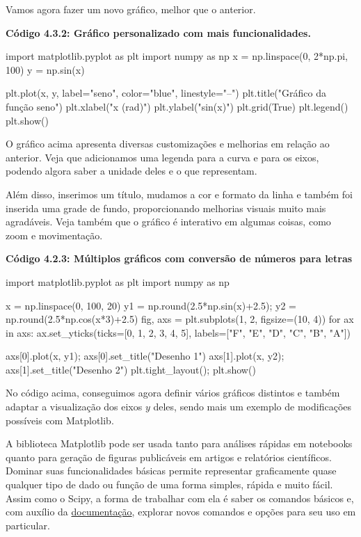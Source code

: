 \documentclass[11pt, a4paper]{article}
\begin{document}
Vamos agora fazer um novo gráfico, melhor que o anterior.

\textbf{Código 4.3.2: Gráfico personalizado com mais funcionalidades.}

\begin{code}
import matplotlib.pyplot as plt
import numpy as np
x = np.linspace(0, 2*np.pi, 100)
y = np.sin(x)

plt.plot(x, y, label="seno", color="blue", linestyle="--")
plt.title("Gráfico da função seno")
plt.xlabel("x (rad)")
plt.ylabel("sin(x)")
plt.grid(True)
plt.legend()
plt.show()
\end{code}

O gráfico acima apresenta diversas customizações e melhorias em relação ao anterior. Veja que adicionamos uma legenda para a curva e para os eixos, podendo algora saber a unidade deles e o que representam.

Além disso, inserimos um título, mudamos a cor e formato da linha e também foi inserida uma grade de fundo, proporcionando melhorias visuais muito mais agradáveis. Veja também que o gráfico é interativo em algumas coisas, como zoom e movimentação.

\textbf{Código 4.2.3: Múltiplos gráficos com conversão de números para letras}

\begin{code}
import matplotlib.pyplot as plt
import numpy as np

x = np.linspace(0, 100, 20)
y1 = np.round(2.5*np.sin(x)+2.5); y2 = np.round(2.5*np.cos(x*3)+2.5)
fig, axs = plt.subplots(1, 2, figsize=(10, 4))
for ax in axs:
    ax.set_yticks(ticks=[0, 1, 2, 3, 4, 5], labels=["F", "E", "D", "C", "B", "A"])

axs[0].plot(x, y1); axs[0].set_title("Desenho 1")
axs[1].plot(x, y2); axs[1].set_title("Desenho 2")
plt.tight_layout(); plt.show()
\end{code}

No código acima, conseguimos agora definir vários gráficos distintos e também adaptar a visualização dos eixos \(y\) deles, sendo mais um exemplo de modificações possíveis com Matplotlib.

A biblioteca Matplotlib pode ser usada tanto para análises rápidas em notebooks quanto para geração de figuras publicáveis em artigos e relatórios científicos. Dominar suas funcionalidades básicas permite representar graficamente quase qualquer tipo de dado ou função de uma forma simples, rápida e muito fácil. Assim como o Scipy, a forma de trabalhar com ela é saber os comandos básicos e, com auxílio da \href{https://matplotlib.org/stable/index.html}{documentação}, explorar novos comandos e opções para seu uso em particular.
\end{document}
